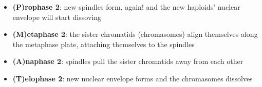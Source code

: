 \documentclass[letterpaper]{article}
\begin{document}
\begin{itemize}
\item \textbf{(P)rophase 2}: new spindles form, again! and the new haploids'
nuclear envelope will start dissoving
\item \textbf{(M)etaphase 2}: the sister chromatids (chromasomes) align themselves
along the metaphase plate, attaching themselves to the spindles
\item \textbf{(A)naphase 2}: spindles pull the sister chromatids away from each
other
\item \textbf{(T)elophase 2}: new nuclear envelope forms and the chromasomes
dissolves
\end{itemize}
\end{document}

